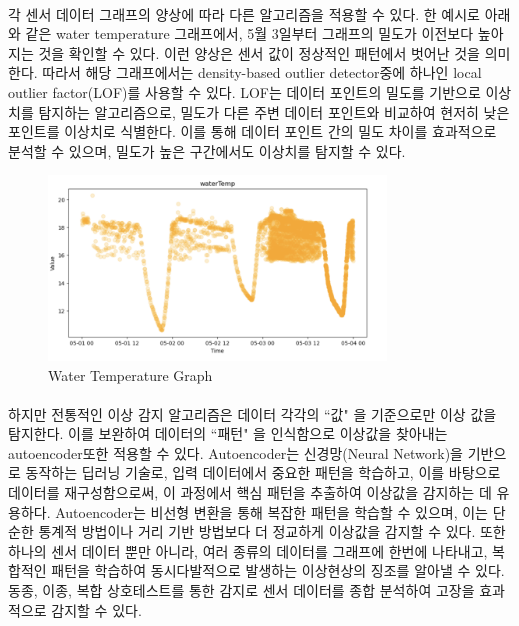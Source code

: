 \documentclass[11pt]{article}
\begin{document}
    \paragraph {} 각 센서 데이터 그래프의 양상에 따라 다른 알고리즘을 적용할 수 있다. 한 예시로 아래와 같은 water temperature 그래프에서, 5월 3일부터 그래프의 밀도가 이전보다 높아지는 것을 확인할 수 있다. 이런 양상은 센서 값이 정상적인 패턴에서 벗어난 것을 의미한다. 따라서 해당 그래프에서는 density-based outlier detector중에 하나인 local outlier factor(LOF)를 사용할 수 있다. LOF는 데이터 포인트의 밀도를 기반으로 이상치를 탐지하는 알고리즘으로, 밀도가 다른 주변 데이터 포인트와 비교하여 현저히 낮은 포인트를 이상치로 식별한다. 이를 통해 데이터 포인트 간의 밀도 차이를 효과적으로 분석할 수 있으며, 밀도가 높은 구간에서도 이상치를 탐지할 수 있다.

    \begin{figure}[h]
    \centering
    \includegraphics[width=0.8\textwidth]{Latex_Proposal/images/water_temperature_graph.png} %
    \caption{Water Temperature Graph }
    \label{fig:water_temp_graph}
    \end{figure}

    \paragraph   {} 하지만 전통적인 이상 감지 알고리즘은 데이터 각각의 “값" 을 기준으로만 이상 값을 탐지한다. 이를 보완하여 데이터의 “패턴" 을 인식함으로 이상값을 찾아내는 autoencoder또한 적용할 수 있다\citep{adkisson2021autoencoder}. Autoencoder는 신경망(Neural Network)을 기반으로 동작하는 딥러닝 기술로, 입력 데이터에서 중요한 패턴을 학습하고, 이를 바탕으로 데이터를 재구성함으로써, 이 과정에서 핵심 패턴을 추출하여 이상값을 감지하는 데 유용하다. Autoencoder는 비선형 변환을 통해 복잡한 패턴을 학습할 수 있으며, 이는 단순한 통계적 방법이나 거리 기반 방법보다 더 정교하게 이상값을 감지할 수 있다. 또한 하나의 센서 데이터 뿐만 아니라, 여러 종류의 데이터를 그래프에 한번에 나타내고, 복합적인 패턴을 학습하여 동시다발적으로 발생하는 이상현상의 징조를 알아낼 수 있다. 동종, 이종, 복합 상호테스트를 통한 감지로 센서 데이터를 종합 분석하여 고장을 효과적으로 감지할 수 있다\citep{lin2018sensortalk}.
\end{document}
